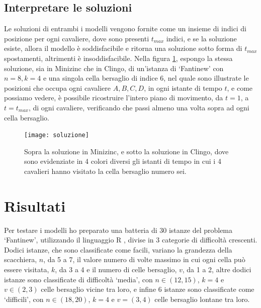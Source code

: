\documentclass[12pt]{article}
\begin{document}
\subsection{Interpretare le soluzioni}
Le soluzioni di entrambi i modelli vengono fornite come un insieme di indici di posizione per ogni cavaliere, dove sono presenti $t_{max}$ indici, e se la soluzione esiste, allora il modello è soddisfacibile e ritorna una soluzione sotto forma di $t_{max}$ spostamenti, altrimenti è insoddisfacibile. 
Nella figura \ref{img:solution}, espongo la stessa soluzione, sia in Minizinc che in Clingo, di un'istanza di ‘Fantinew’ con $n=8,k=4$ e una singola cella bersaglio di indice $6$, nel quale sono illustrate le posizioni che occupa ogni cavaliere $A,B,C,D$, in ogni istante di tempo $t$, 
e come possiamo vedere, è possibile ricostruire l'intero piano di movimento, da $t=1$, a $t=t_{max}$, di ogni cavaliere, verificando che passi almeno una volta sopra ad ogni cella bersaglio.

\begin{figure}[H]
    \centering
    \texttt{[image: soluzione]}
    \caption{Sopra la soluzione in Minizinc, e sotto la soluzione in Clingo, dove sono evidenziate in 4 colori diversi gli istanti di tempo in cui i 4 cavalieri hanno visitato la cella bersaglio numero sei.}
    \label{img:solution}
\end{figure}

\section{Risultati}
Per testare i modelli ho preparato una batteria di 30 istanze del problema ‘Fantinew’, utilizzando il linguaggio R \cite{cit:r}, divise in 3 categorie di difficoltà crescenti. 
Dodici istanze, che sono classificate come facili, variano la grandezza della scacchiera, $n$, da 5 a 7, il valore numero di volte massimo in cui ogni cella può essere visitata, $k$, da 3 a 4 e il numero di celle bersaglio, $v$, da 1 a 2, altre dodici istanze sono classificate di difficoltà ‘media’, con $n \in (12,15)$, $k=4$ e $v \in (2,3)$ celle bersaglio vicine tra loro, e 
infine 6 istanze sono classificate come ‘difficili’, con $n \in (18,20)$, $k=4$ e $v = (3,4)$ celle bersaglio lontane tra loro.
\end{document}
